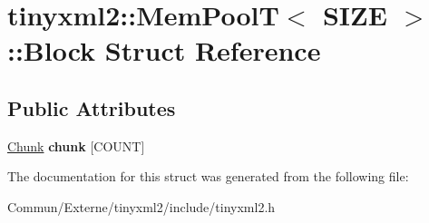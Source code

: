 \hypertarget{structtinyxml2_1_1_mem_pool_t_1_1_block}{}\section{tinyxml2\+:\+:Mem\+PoolT$<$ S\+I\+ZE $>$\+:\+:Block Struct Reference}
\label{structtinyxml2_1_1_mem_pool_t_1_1_block}
\subsection*{Public Attributes}
\begin{DoxyCompactItemize}
\item 
\hyperlink{uniontinyxml2_1_1_mem_pool_t_1_1_chunk}{Chunk} {\bfseries chunk} \mbox{[}C\+O\+U\+NT\mbox{]}\hypertarget{structtinyxml2_1_1_mem_pool_t_1_1_block_ae9cbe79b82d9490f15cc00d9694989e8}{}\label{structtinyxml2_1_1_mem_pool_t_1_1_block_ae9cbe79b82d9490f15cc00d9694989e8}

\end{DoxyCompactItemize}


The documentation for this struct was generated from the following file\+:\begin{DoxyCompactItemize}
\item 
Commun/\+Externe/tinyxml2/include/tinyxml2.\+h\end{DoxyCompactItemize}
